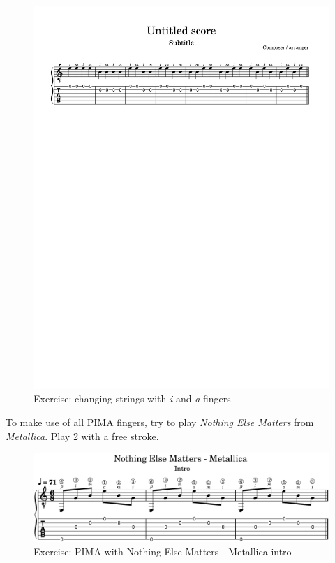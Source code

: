 \begin{figure}[h]
    \centering
    \includegraphics[width=\textwidth]{image/TwoStringAlternating.png}
    \caption{Exercise: changing strings with \textit{i} and \textit{a} fingers}
    \label{fig:exercise_i_m_string_change}
\end{figure}

To make use of all PIMA fingers, try to play \textit{Nothing Else Matters} from \textit{Metallica}. Play \ref{fig:exercise_nothing_else_matters_metallica_intro_pima} with a free stroke.

\begin{figure}[h]
    \centering
    \includegraphics[width=\textwidth]{image/NothinElseMatters_Metallica_Intro.png}
    \caption{Exercise: PIMA with Nothing Else Matters - Metallica intro}
    \label{fig:exercise_nothing_else_matters_metallica_intro_pima}
\end{figure}

